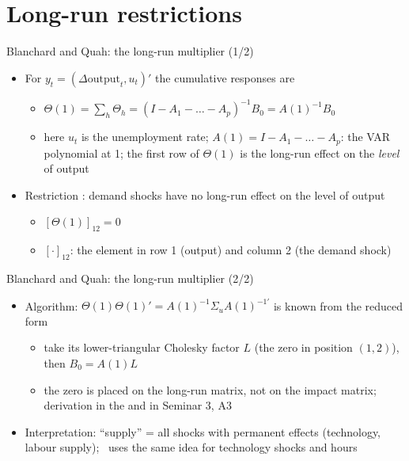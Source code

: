 \section{Long-run restrictions}

\begin{frame}{Blanchard and Quah: the long-run multiplier (1/2)}
\itemsize{\small}
\begin{itemize}
    \item For $y_t = (\Delta\text{output}_t, u_t)'$ the cumulative responses are
    \begin{itemize}
        \item $\Theta(1) = \sum_h\Theta_h = (I - A_1 - \dots - A_p)^{-1}B_0 = A(1)^{-1}B_0$
        \item here $u_t$ is the unemployment rate; $A(1) = I - A_1 - \dots - A_p$: the VAR polynomial at 1; the first row of $\Theta(1)$ is the long-run effect on the \emph{level} of output
    \end{itemize}
    \item Restriction : demand shocks have no long-run effect on the level of output
    \begin{itemize}
        \item $[\Theta(1)]_{12} = 0$
        \item $[\cdot]_{12}$: the element in row 1 (output) and column 2 (the demand shock)
    \end{itemize}
\end{itemize}
\end{frame}

\begin{frame}{Blanchard and Quah: the long-run multiplier (2/2)}
\itemsize{\small}
\begin{itemize}
    \item Algorithm: $\Theta(1)\Theta(1)' = A(1)^{-1}\Sigma_uA(1)^{-1\prime}$ is known from the reduced form
    \begin{itemize}
        \item take its lower-triangular Cholesky factor $L$ (the zero in position $(1,2)$), then $B_0 = A(1)L$
        \item the zero is placed on the long-run matrix, not on the impact matrix; derivation in the  and in Seminar 3, A3
    \end{itemize}
    \item Interpretation: ``supply'' = all shocks with permanent effects (technology, labour supply); \ uses the same idea for technology shocks and hours
\end{itemize}
\end{frame}

